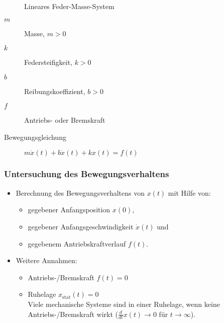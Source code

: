 \begin{figure}[H]
				\caption{Lineares Feder-Masse-System}
			\end{figure}
			
			\begin{description}
				\item[\(m\)] Masse, \( m > 0 \)
				\item[\(k\)] Federsteifigkeit, \( k > 0 \)
				\item[\(b\)] Reibungskoeffizient, \( b > 0 \)
				\item[\(f\)] Antriebs- oder Bremskraft
				\item[Bewegungsgleichung] \( m\ddot{x}(t) + b\dot{x}(t) + kx(t) = f(t) \)
			\end{description}
			
			\subsubsection{Untersuchung des Bewegungsverhaltens} %
				\begin{itemize}
					\item Berechnung des Bewegungsverhaltens von \(x(t)\) mit Hilfe von:
						\begin{itemize}
							\item gegebener Anfangsposition \(x(0)\),
							\item gegebener Anfangsgeschwindigkeit \(\dot{x}(t)\) und
							\item gegebenem Antriebskraftverlauf \(f(t)\).
						\end{itemize}
					\item Weitere Annahmen:
						\begin{itemize}
							\item Antriebs-/Bremskraft \(f(t) = 0\)
							\item Ruhelage \( x _ \text{stat} (t) = 0 \) \\ Viele mechanische Systeme sind in einer Ruhelage, wenn keine Antriebs-/Bremskraft wirkt (\( \frac{d}{dt}x(t)  \rightarrow 0 \) für \( t \rightarrow \infty \)).
						\end{itemize}
				\end{itemize}
			
